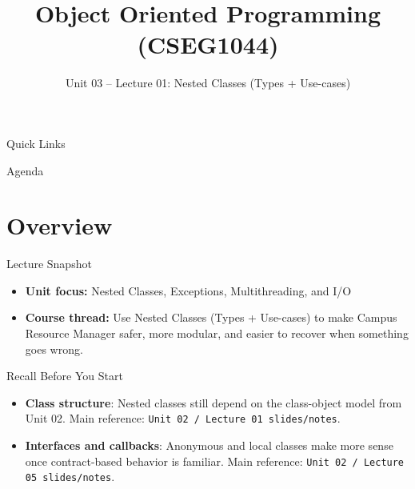 \documentclass{beamer}
\title[OOPS with Java]{Object Oriented Programming (CSEG1044)}
\subtitle{Unit 03 -- Lecture 01: Nested Classes (Types + Use-cases)}
\begin{document}
\begin{frame}[fragile]
  \titlepage
  \vspace{0.5em}
  \slidesources{\OOPSUnitIIISources}
\end{frame}

\begin{frame}{Quick Links}
  \centering
  \hyperlink{sec:overview}{}\hspace{0.6em}
  \hyperlink{sec:concepts}{}\hspace{0.6em}
  \hyperlink{sec:demo}{}\hspace{0.6em}
  \hyperlink{sec:summary}{}
  \slidesources{\OOPSUnitIIISources}
\end{frame}

\begin{frame}{Agenda}
  \tableofcontents
  \slidesources{\OOPSUnitIIISources}
\end{frame}

\section{Overview}
\label{sec:overview}

\begin{frame}{Lecture Snapshot}
\begin{itemize}[<+->]
  \item \textbf{Unit focus:} Nested Classes, Exceptions, Multithreading, and I/O
  \item \textbf{Course thread:} Use Nested Classes (Types + Use-cases) to make Campus Resource Manager safer, more modular, and easier to recover when something goes wrong.
\end{itemize}
  \slidesources{\OOPSUnitIIISources}
\end{frame}

\begin{frame}{Recall Before You Start}
\begin{itemize}[<+->]
  \item \textbf{Class structure}: Nested classes still depend on the class-object model from Unit 02. Main reference: \texttt{Unit 02 / Lecture 01 slides/notes}.
  \item \textbf{Interfaces and callbacks}: Anonymous and local classes make more sense once contract-based behavior is familiar. Main reference: \texttt{Unit 02 / Lecture 05 slides/notes}.
\end{itemize}
  \slidesources{\OOPSUnitIIISources}
\end{frame}
\end{document}
